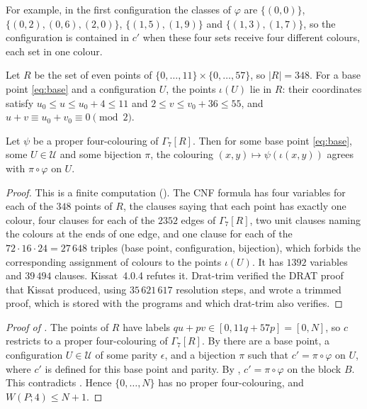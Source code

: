 \documentclass[11pt,colorlinks]{charlie}
\begin{document}
For example, in the first configuration the classes of $\varphi$ are $\{(0,0)\}$, $\{(0,2),(0,6),(2,0)\}$, $\{(1,5),(1,9)\}$ and $\{(1,3),(1,7)\}$, so the configuration is contained in $c'$ when these four sets receive four different colours, each set in one colour.

Let $R$ be the set of even points of $\{0,\dots,11\}\times\{0,\dots,57\}$, so $|R|=348$. For a base point \eqref{eq:base} and a configuration $U$, the points $\iota(U)$ lie in $R$: their coordinates satisfy $u_0\le u\le u_0+4\le11$ and $2\le v\le v_0+36\le55$, and $u+v\equiv u_0+v_0\equiv0\pmod2$.

\begin{lemma}\label{lem:sat}
Let $\psi$ be a proper four-colouring of $\Gamma_7[R]$. Then for some base point \eqref{eq:base}, some $U\in\mathcal U$ and some bijection $\pi$, the colouring $(x,y)\mapsto\psi(\iota(x,y))$ agrees with $\pi\circ\varphi$ on $U$.
\end{lemma}

\begin{proof}
This is a finite computation (). The CNF formula has four variables for each of the $348$ points of $R$, the clauses saying that each point has exactly one colour, four clauses for each of the $2352$ edges of $\Gamma_7[R]$, two unit clauses naming the colours at the ends of one edge, and one clause for each of the $72\cdot16\cdot24=27\,648$ triples (base point, configuration, bijection), which forbids the corresponding assignment of colours to the points $\iota(U)$. It has $1392$ variables and $39\,494$ clauses. Kissat~4.0.4 refutes it. Drat-trim verified the DRAT proof that Kissat produced, using $35\,621\,617$ resolution steps, and wrote a trimmed proof, which is stored with the programs and which drat-trim also verifies.
\end{proof}

\begin{proof}[Proof of ]
The points of $R$ have labels $qu+pv\in[0,11q+57p]=[0,N]$, so $c$ restricts to a proper four-colouring of $\Gamma_7[R]$. By  there are a base point, a configuration $U\in\mathcal U$ of some parity $\epsilon$, and a bijection $\pi$ such that $c'=\pi\circ\varphi$ on $U$, where $c'$ is defined for this base point and parity. By , $c'=\pi\circ\varphi$ on the block $B$. This contradicts . Hence $\{0,\dots,N\}$ has no proper four-colouring, and $W(P;4)\le N+1$.
\end{proof}
\end{document}
